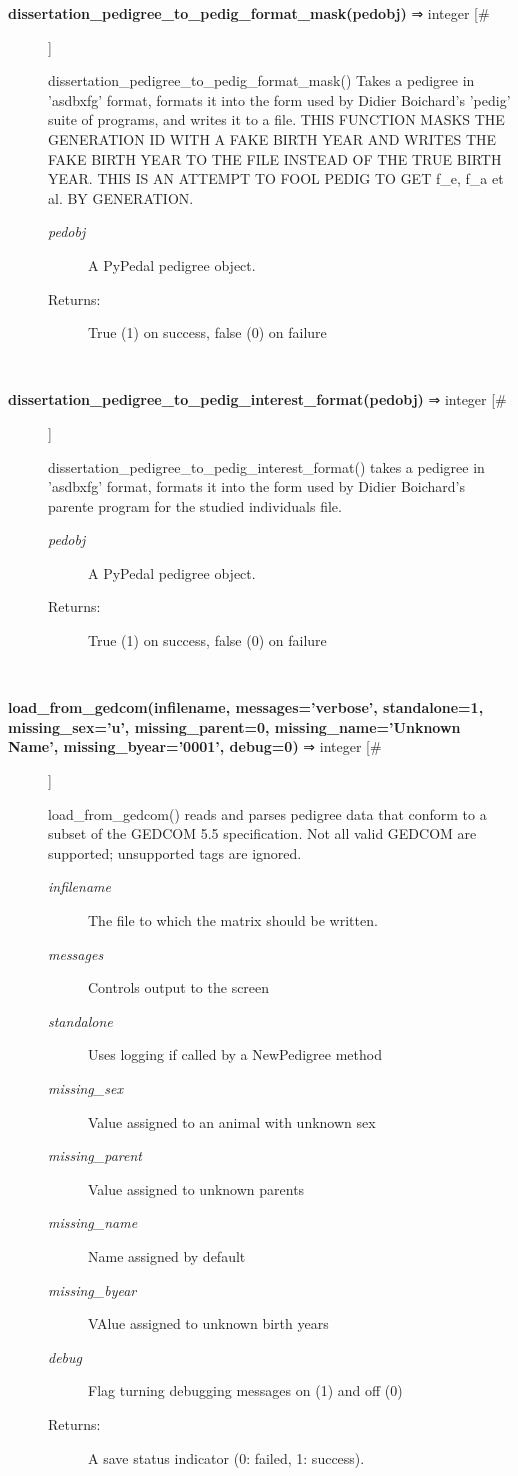 \begin{description}
\item[\textbf{dissertation\_pedigree\_to\_pedig\_format\_mask(pedobj)} ⇒ integer [\#]
]
\par dissertation\_pedigree\_to\_pedig\_format\_mask() Takes a pedigree in 'asdbxfg' format,
formats it into the form used by Didier Boichard's 'pedig' suite of programs, and
writes it to a file.  THIS FUNCTION MASKS THE GENERATION ID WITH A FAKE BIRTH YEAR
AND WRITES THE FAKE BIRTH YEAR TO THE FILE INSTEAD OF THE TRUE BIRTH YEAR.  THIS IS
AN ATTEMPT TO FOOL PEDIG TO GET f\_e, f\_a et al. BY GENERATION.
\begin{description}
\item[\textit{pedobj}
]
A PyPedal pedigree object.
\item[Returns:
]
True (1) on success, false (0) on failure
\end{description}\\

\item[\textbf{dissertation\_pedigree\_to\_pedig\_interest\_format(pedobj)} ⇒ integer [\#]
]
\par dissertation\_pedigree\_to\_pedig\_interest\_format() takes a pedigree in 'asdbxfg' format,
formats it into the form used by Didier Boichard's parente program for the studied
individuals file.
\begin{description}
\item[\textit{pedobj}
]
A PyPedal pedigree object.
\item[Returns:
]
True (1) on success, false (0) on failure
\end{description}\\

\item[\textbf{load\_from\_gedcom(infilename, messages='verbose', standalone=1, missing\_sex='u', missing\_parent=0, missing\_name='Unknown Name', missing\_byear='0001', debug=0)} ⇒ integer [\#]
]
\par load\_from\_gedcom() reads and parses pedigree data that conform to
a subset of the GEDCOM 5.5 specification. Not all valid GEDCOM
are supported; unsupported tags are ignored.
\begin{description}
\item[\textit{infilename}
]
The file to which the matrix should be written.
\item[\textit{messages}
]
Controls output to the screen
\item[\textit{standalone}
]
Uses logging if called by a NewPedigree method
\item[\textit{missing\_sex}
]
Value assigned to an animal with unknown sex
\item[\textit{missing\_parent}
]
Value assigned to unknown parents
\item[\textit{missing\_name}
]
Name assigned by default
\item[\textit{missing\_byear}
]
VAlue assigned to unknown birth years
\item[\textit{debug}
]
Flag turning debugging messages on (1) and off (0)
\item[Returns:
]
A save status indicator (0: failed, 1: success).
\end{description}\\


\end{description}
